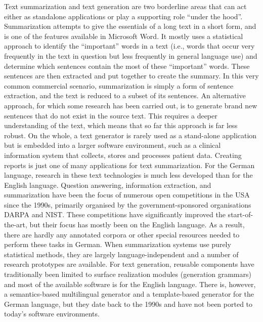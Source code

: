 \documentclass[]{../metanetpaper}
\begin{document}
Text summarization and text generation are two borderline areas that can act either as standalone applications or play a supporting role “under the hood”. Summarization attempts to give the essentials of a long text in a short form, and is one of the features available in Microsoft Word. It mostly uses a statistical approach to identify the “important” words in a text (i.e., words that occur very frequently in the text in question but less frequently in general language use) and determine which sentences contain the most of these “important” words. These sentences are then extracted and put together to create the summary. In this very common commercial scenario, summarization is simply a form of sentence extraction, and the text is reduced to a subset of its sentences. An alternative approach, for which some research has been carried out, is to generate brand new sentences that do not exist in the source text. This requires a deeper understanding of the text, which means that so far this approach is far less robust. On the whole, a text generator is rarely used as a stand-alone application but is embedded into a larger software environment, such as a clinical information system that collects, stores and processes patient data. Creating reports is just one of many applications for text summarization. 
For the German language, research in these text technologies is much less developed than for the English language. Question answering, information extraction, and summarization have been the focus of numerous open competitions in the USA since the 1990s, primarily organised by the government-sponsored organisations DARPA and NIST. These competitions have significantly improved the start-of-the-art, but their focus has mostly been on the English language. As a result, there are hardly any annotated corpora or other special resources needed to perform these tasks in German. When summarization systems use purely statistical methods, they are largely language-independent and a number of research prototypes are available. For text generation, reusable components have traditionally been limited to surface realization modules (generation grammars) and most of the available software is for the English language. There is, however, a semantics-based multilingual generator and a template-based generator for the German language, but they date back to the 1990s and have not been ported to today’s software environments.
	
\end{document}
